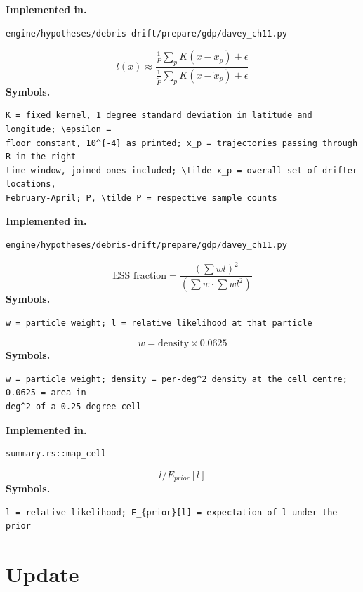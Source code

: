 \documentclass[11pt,a4paper]{article}
\begin{document}
\noindent\textbf{Implemented in.}
\begin{verbatim}
engine/hypotheses/debris-drift/prepare/gdp/davey_ch11.py
\end{verbatim}
\medskip
\begin{equation}
l(x) \approx \frac{\frac{1}{P}\sum_p K(x - x_p) + \epsilon}{\frac{1}{\tilde P}\sum_p K(x - \tilde x_p) + \epsilon}
\end{equation}
\noindent\textbf{Symbols.}
\begin{verbatim}
K = fixed kernel, 1 degree standard deviation in latitude and longitude; \epsilon =
floor constant, 10^{-4} as printed; x_p = trajectories passing through R in the right
time window, joined ones included; \tilde x_p = overall set of drifter locations,
February-April; P, \tilde P = respective sample counts
\end{verbatim}
\noindent\textbf{Implemented in.}
\begin{verbatim}
engine/hypotheses/debris-drift/prepare/gdp/davey_ch11.py
\end{verbatim}
\medskip
\begin{equation}
\text{ESS fraction} = \frac{(\sum w l)^2}{(\sum w \cdot \sum w l^2)}
\end{equation}
\noindent\textbf{Symbols.}
\begin{verbatim}
w = particle weight; l = relative likelihood at that particle
\end{verbatim}
\medskip
\begin{equation}
w = \text{density} \times 0.0625
\end{equation}
\noindent\textbf{Symbols.}
\begin{verbatim}
w = particle weight; density = per-deg^2 density at the cell centre; 0.0625 = area in
deg^2 of a 0.25 degree cell
\end{verbatim}
\noindent\textbf{Implemented in.}
\begin{verbatim}
summary.rs::map_cell
\end{verbatim}
\medskip
\begin{equation}
l / E_{prior}[l]
\end{equation}
\noindent\textbf{Symbols.}
\begin{verbatim}
l = relative likelihood; E_{prior}[l] = expectation of l under the prior
\end{verbatim}
\medskip
\section{Update}
\end{document}
